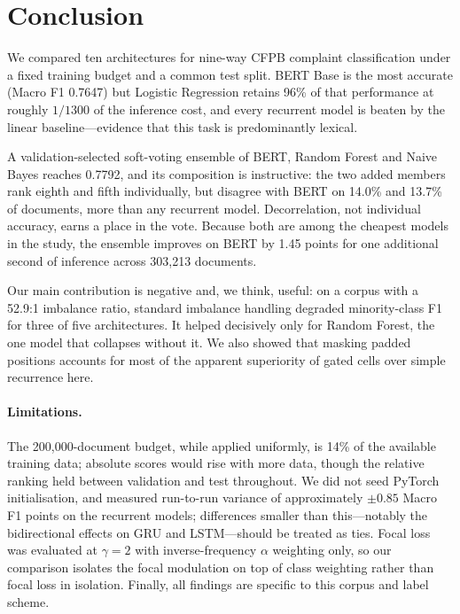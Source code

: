 \documentclass[11pt]{article}
\begin{document}
\section{Conclusion}
\label{sec:conclusion}

We compared ten architectures for nine-way CFPB complaint classification under
a fixed training budget and a common test split. BERT Base is the most accurate
(Macro F1 0.7647) but Logistic Regression retains 96\% of that performance at
roughly $1/1300$ of the inference cost, and every recurrent model is beaten by
the linear baseline---evidence that this task is predominantly lexical.

A validation-selected soft-voting ensemble of BERT, Random Forest and Naive
Bayes reaches 0.7792, and its composition is instructive: the two added members
rank eighth and fifth individually, but disagree with BERT on 14.0\% and 13.7\%
of documents, more than any recurrent model. Decorrelation, not individual
accuracy, earns a place in the vote. Because both are among the cheapest models
in the study, the ensemble improves on BERT by 1.45 points for one additional
second of inference across 303{,}213 documents.

Our main contribution is negative and, we think, useful: on a corpus with a
52.9:1 imbalance ratio, standard imbalance handling degraded minority-class F1
for three of five architectures. It helped decisively only for Random Forest,
the one model that collapses without it. We also showed that masking padded
positions accounts for most of the apparent superiority of gated cells over
simple recurrence here.

\paragraph{Limitations.}
The 200{,}000-document budget, while applied uniformly, is 14\% of the available
training data; absolute scores would rise with more data, though the relative
ranking held between validation and test throughout. We did not seed PyTorch
initialisation, and measured run-to-run variance of approximately $\pm0.85$
Macro F1 points on the recurrent models; differences smaller than this---notably
the bidirectional effects on GRU and LSTM---should be treated as ties. Focal
loss was evaluated at $\gamma=2$ with inverse-frequency $\alpha$ weighting only,
so our comparison isolates the focal modulation on top of class weighting rather
than focal loss in isolation. Finally, all findings are specific to this corpus
and label scheme.
\end{document}
